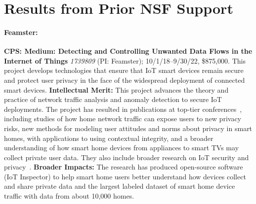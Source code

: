 \section{Results from Prior NSF Support}

\paragraph{Feamster:}
\textbf{CPS: Medium: Detecting and Controlling Unwanted
Data Flows in the Internet of Things} \textit{1739809} (PI: Feamster);
10/1/18--9/30/22, \$875,000.   
This
project develops technologies that ensure that IoT smart devices remain secure
and protect user privacy in the face of the widespread deployment of connected
smart devices. 
\textbf{Intellectual Merit:} This project advances the theory and practice of network traffic
analysis and anomaly detection to secure IoT deployments. The project
has resulted in publications at top-tier 
conferences~\cite{hooman2019:ccs,chu2018:iot:iotj,zheng2018:iot:cscw,feamster2018:iot:ctlj,doshi2018:iot,apthorpe2018:iot:imwut,datta2018:iot,acar2018:iot,weinberg2019:iot:www}, including studies of how home network traffic can
expose users to new privacy risks, new methods for modeling user attitudes and
norms about 
privacy in smart homes, with applications to using contextual integrity,
and a broader understanding of how smart home 
devices from appliances to smart
TVs may 
collect private user data. They also include broader research on IoT
security and
privacy~\cite{chu2018:iot:iotj,zheng2018:iot:cscw,feamster2018:iot:ctlj,doshi2018:iot,apthorpe2018:iot:imwut,datta2018:iot,acar2018:iot,weinberg2019:iot:www}.
\textbf{Broader Impacts:} The research
has produced open-source software (IoT Inspector) to help smart home users better understand
how devices collect and share private data and the largest
labeled dataset of smart home device traffic with data from about 10,000
homes.

